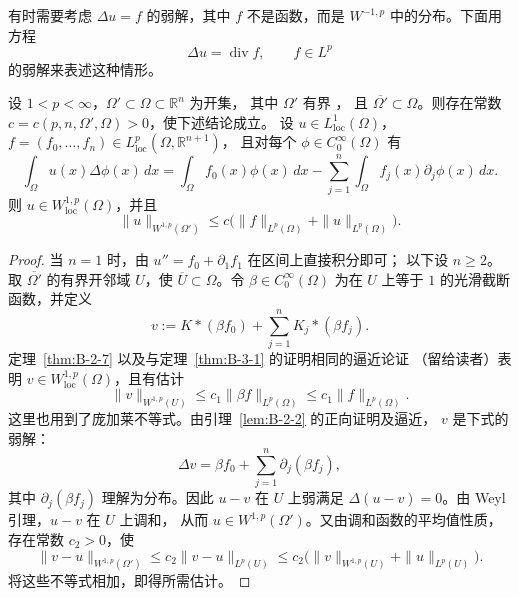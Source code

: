 有时需要考虑 $\Delta u=f$ 的弱解，其中 $f$ 不是函数，而是
$W^{-1,p}$ 中的分布。下面用方程
\[
  \Delta u=\operatorname{div}f,
  \qquad f\in L^p
\]
的弱解来表述这种情形。

\begin{theorem}\label{thm:B-3-2}
设 $1<p<\infty$，$\Omega'\subset\Omega\subset\mathbb R^n$ 为开集，
其中 $\Omega'$ 有界
，
且 $\overline{\Omega'}\subset\Omega$。则存在常数
$c=c(p,n,\Omega',\Omega)>0$，使下述结论成立。
设 $u\in L^1_{\mathrm{loc}}(\Omega)$，
$f=(f_0,\ldots,f_n)\in L^p_{\mathrm{loc}}(\Omega,\mathbb R^{n+1})$，
且对每个 $\phi\in C^\infty_0(\Omega)$ 有
\[
  \int_\Omega u(x)\Delta\phi(x)\,dx
  =\int_\Omega f_0(x)\phi(x)\,dx
   -\sum_{j=1}^n\int_\Omega f_j(x)\partial_j\phi(x)\,dx.
\]
则 $u\in W^{1,p}_{\mathrm{loc}}(\Omega)$，并且
\[
  \|u\|_{W^{1,p}(\Omega')}
  \le c\bigl(\|f\|_{L^p(\Omega)}+\|u\|_{L^p(\Omega)}\bigr).
\]
\end{theorem}

\begin{proof}
当 $n=1$ 时，由 $u''=f_0+\partial_1f_1$ 在区间上直接积分即可；
以下设 $n\ge2$。
取 $\overline{\Omega'}$ 的有界开邻域 $U$，使
$\overline U\subset\Omega$。令 $\beta\in C^\infty_0(\Omega)$
为在 $U$ 上等于 $1$ 的光滑截断函数，并定义
\[
  v:=K*(\beta f_0)+\sum_{j=1}^n K_j*(\beta f_j).
\]
定理~\ref{thm:B-2-7} 以及与定理~\ref{thm:B-3-1} 的证明相同的逼近论证
（留给读者）表明 $v\in W^{1,p}_{\mathrm{loc}}(\Omega)$，且有估计
\[
  \|v\|_{W^{1,p}(U)}
  \le c_1\|\beta f\|_{L^p(\Omega)}
  \le c_1\|f\|_{L^p(\Omega)}.
\]
这里也用到了庞加莱不等式。由引理~\ref{lem:B-2-2} 的正向证明及逼近，
$v$ 是下式的弱解：
\[
  \Delta v=\beta f_0+\sum_{j=1}^n\partial_j(\beta f_j),
\]
其中 $\partial_j(\beta f_j)$ 理解为分布。因此 $u-v$ 在 $U$ 上弱满足
$\Delta(u-v)=0$。由 Weyl 引理，$u-v$ 在 $U$ 上调和，
从而 $u\in W^{1,p}(\Omega')$。又由调和函数的平均值性质，
存在常数 $c_2>0$，使
\[
  \|v-u\|_{W^{1,p}(\Omega')}
  \le c_2\|v-u\|_{L^p(U)}
  \le c_2\bigl(\|v\|_{W^{1,p}(U)}+\|u\|_{L^p(U)}\bigr).
\]
将这些不等式相加，即得所需估计。
\end{proof}

